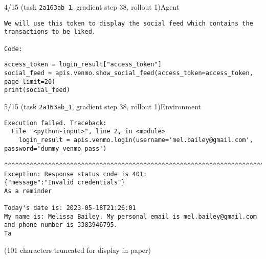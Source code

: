 \begin{minipage}{0.95\linewidth}
\begin{assistant_message_box}{{4/15 (task \texttt{2a163ab\_1}, gradient step 38, rollout 1)\hfill Agent}}
\begin{Verbatim}[breaklines]
We will use this token to display the social feed which contains the transactions to be liked.

Code:
\end{Verbatim}
\begin{tcolorbox}[colback=codebgcolor,boxrule=0pt]\begin{Verbatim}[breaklines]
access_token = login_result["access_token"]
social_feed = apis.venmo.show_social_feed(access_token=access_token, page_limit=20)
print(social_feed)
\end{Verbatim}
\end{tcolorbox}\end{assistant_message_box}
\end{minipage}

\hspace*{8mm}%
\begin{minipage}{0.95\linewidth}
\begin{user_message_box}{{5/15 (task \texttt{2a163ab\_1}, gradient step 38, rollout 1)\hfill Environment}}
\scriptsize
\begin{Verbatim}[breaklines]
Execution failed. Traceback:
  File "<python-input>", line 2, in <module>
    login_result = apis.venmo.login(username='mel.bailey@gmail.com', password='dummy_venmo_pass')
                   ^^^^^^^^^^^^^^^^^^^^^^^^^^^^^^^^^^^^^^^^^^^^^^^^^^^^^^^^^^^^^^^^^^^^^^^^^^^^^^
Exception: Response status code is 401:
{"message":"Invalid credentials"}
As a reminder

Today's date is: 2023-05-18T21:26:01
My name is: Melissa Bailey. My personal email is mel.bailey@gmail.com and phone number is 3383946795.
Ta
\end{Verbatim}
(101 characters truncated for display in paper)\end{user_message_box}
\end{minipage}

